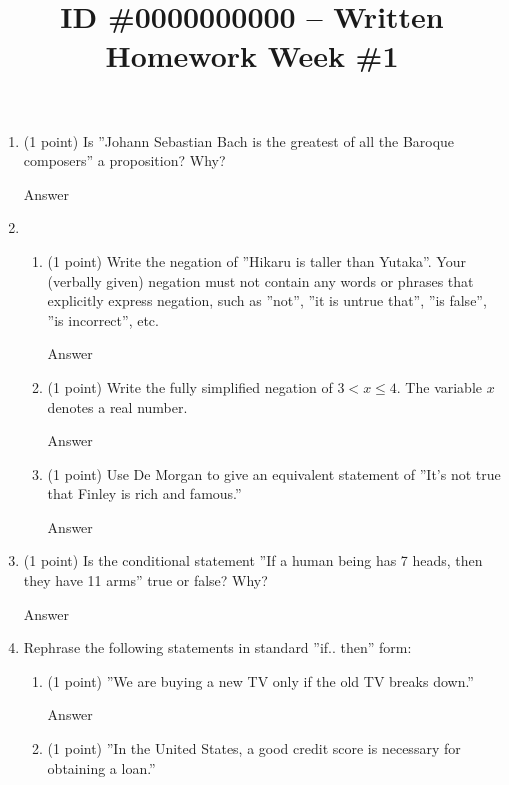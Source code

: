 \documentclass{article}
\title{ID \#0000000000 – Written Homework Week \#1}
\begin{document}
\maketitle


\begin{enumerate}
    \item (1 point) Is ”Johann Sebastian Bach is the greatest of all the Baroque composers” a proposition? Why?
    
    \color{blue}
        Answer
    \color{black}
    
    \item 
    \begin{enumerate}
        \item (1 point) Write the negation of ”Hikaru is taller than Yutaka”. Your (verbally given) negation must not contain any words or phrases that explicitly express negation, such as ”not”, ”it is untrue that”, ”is false”, ”is incorrect”, etc.
        
        \color{blue}
            Answer
        \color{black}
    
        \item (1 point) Write the fully simplified negation of $3 < x \leq 4$. The variable $x$ denotes a real number.
        
        \color{blue}
            Answer
        \color{black}
        
        \item (1 point) Use De Morgan to give an equivalent statement of ”It’s not true that Finley is rich and famous.”
        
        \color{blue}
            Answer
        \color{black}
    \end{enumerate}
    
    \item (1 point) Is the conditional statement ”If a human being has 7 heads, then they have 11 arms” true or false? Why?
    
    \color{blue}
        Answer
    \color{black}
    
    \item Rephrase the following statements in standard ”if.. then” form: 
    \begin{enumerate}
        \item (1 point) ”We are buying a new TV only if the old TV breaks down.” 
        
        \color{blue}
            Answer
        \color{black}
    
        \item (1 point) ”In the United States, a good credit score is necessary for obtaining a loan.”
        

\end{enumerate}
\end{enumerate}
\end{document}
